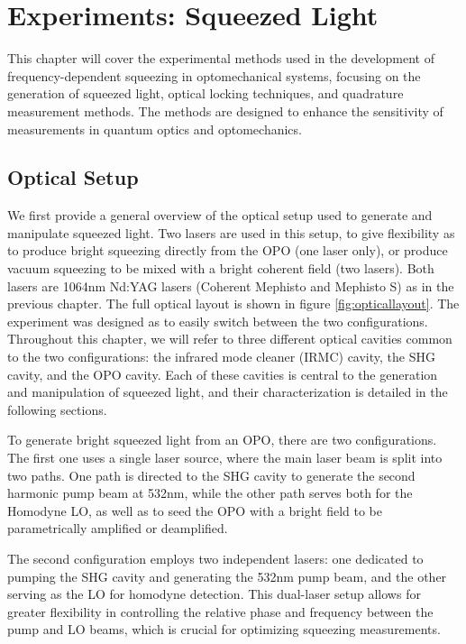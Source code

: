 \chapter{Experiments: Squeezed Light}
This chapter will cover the experimental methods used in the development of frequency-dependent squeezing in optomechanical systems, focusing on the generation of squeezed light, optical locking techniques, and quadrature measurement methods. The methods are designed to enhance the sensitivity of measurements in quantum optics and optomechanics.
\minitoc
\newpage 

\section{Optical Setup}

We first provide a general overview of the optical setup used to generate and manipulate squeezed light. 
Two lasers are used in this setup, to give flexibility as to produce bright squeezing directly from the OPO (one laser only), or produce vacuum squeezing to be mixed with a bright coherent field (two lasers). Both lasers are 1064nm Nd:YAG lasers (Coherent Mephisto and Mephisto S) as in the previous chapter. The full optical layout is shown in figure \ref{fig:opticallayout}. The experiment was designed as to easily switch between the two configurations. Throughout this chapter, we will refer to three different optical cavities common to the two configurations: the infrared mode cleaner (IRMC) cavity, the SHG cavity, and the OPO cavity. Each of these cavities is central to the generation and manipulation of squeezed light, and their characterization is detailed in the following sections. 

To generate bright squeezed light from an OPO, there are two configurations. The first one uses a single laser source, where the main laser beam is split into two paths. One path is directed to the SHG cavity to generate the second harmonic pump beam at 532nm, while the other path serves both for the Homodyne LO, as well as to seed the OPO with a bright field to be parametrically amplified or deamplified. 

The second configuration employs two independent lasers: one dedicated to pumping the SHG cavity and generating the 532nm pump beam, and the other serving as the LO for homodyne detection. This dual-laser setup allows for greater flexibility in controlling the relative phase and frequency between the pump and LO beams, which is crucial for optimizing squeezing measurements.


